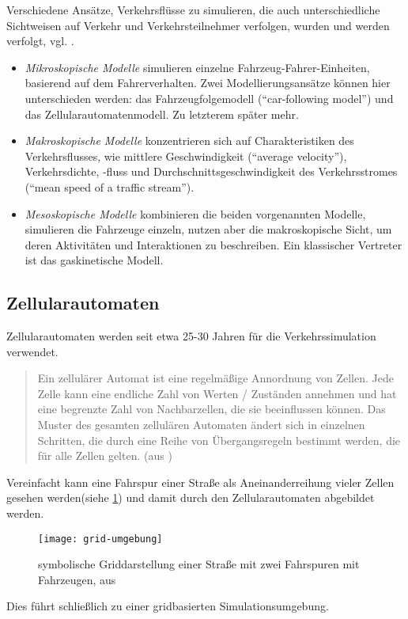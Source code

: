 Verschiedene Ansätze, Verkehrsflüsse zu simulieren, die auch unterschiedliche Sichtweisen auf Verkehr und Verkehrsteilnehmer verfolgen, %
wurden und werden verfolgt, vgl. \cite{dingding}.
\begin{itemize}
	\item \textit{Mikroskopische Modelle} simulieren einzelne Fahrzeug-Fahrer-Einheiten, basierend auf dem Fahrerverhalten. Zwei Modellierungsansätze können hier unterschieden werden: das Fahrzeugfolgemodell (\enquote{car-following model}) und das Zellularautomatenmodell. Zu letzterem später mehr.
	\item \textit{Makroskopische Modelle}  konzentrieren sich auf Charakteristiken des Verkehrsflusses, wie mittlere Geschwindigkeit (\enquote{average velocity}), Verkehrsdichte, -fluss und Durchschnittsgeschwindigkeit des Verkehrsstromes (\enquote{mean speed of a traffic stream}).
	\item \textit{Mesoskopische Modelle} kombinieren die beiden vorgenannten Modelle, simulieren die Fahrzeuge einzeln, nutzen aber die makroskopische Sicht, um deren Aktivitäten und Interaktionen zu beschreiben. Ein klassischer Vertreter ist das gaskinetische Modell.
\end{itemize}



\subsection*{Zellularautomaten}
\label{sec:ca}

Zellularautomaten werden seit etwa 25-30 Jahren für die Verkehrssimulation verwendet.

\begin{quote}
Ein zellulärer Automat ist eine regelmäßige Annordnung von Zellen. Jede Zelle kann eine endliche Zahl von Werten / Zuständen annehmen und hat eine  begrenzte Zahl von Nachbarzellen, die sie beeinflussen können. Das Muster des gesamten zellulären Automaten ändert sich in einzelnen Schritten, die durch eine Reihe von Übergangsregeln bestimmt werden, die für alle Zellen gelten. (aus \cite{cell-autom})
\end{quote} 

\noindent
Vereinfacht kann eine Fahrspur einer Straße als Aneinanderreihung vieler Zellen gesehen werden(siehe \cref{figure:grid-umgebung}) und damit durch den Zellularautomaten abgebildet werden. 
\begin{figure}[hptb]
 \centering
 \texttt{[image: grid-umgebung]}
 \caption[Beispiel für eine Griddarstellung einer Straße]
 		{symbolische Griddarstellung einer Straße mit zwei Fahrspuren mit Fahrzeugen, aus \cite{multi-lane}}
 \label{figure:grid-umgebung}
\end{figure} 
Dies führt schließlich zu einer gridbasierten Simulationsumgebung. 



